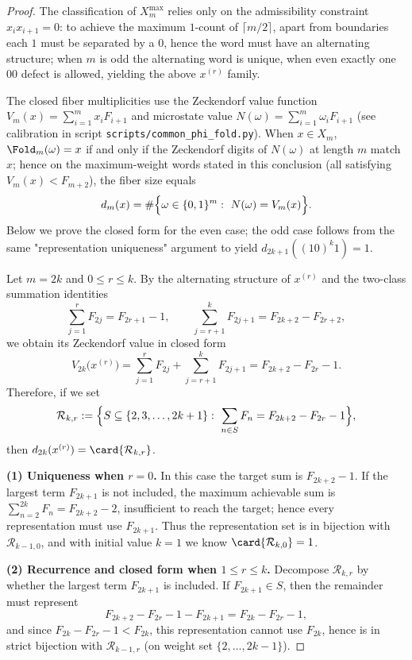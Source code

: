 \begin{proof}
The classification of \(X_m^{\max}\) relies only on the admissibility constraint \(x_ix_{i+1}=0\): to achieve the maximum \(1\)-count of \(\lceil m/2\rceil\), apart from boundaries each \(1\) must be separated by a \(0\), hence the word must have an alternating structure; when \(m\) is odd the alternating word is unique, when even exactly one \(00\) defect is allowed, yielding the above \(x^{(r)}\) family.
\par
The closed fiber multiplicities use the Zeckendorf value function \(V_m(x)=\sum_{i=1}^m x_iF_{i+1}\) and microstate value \(N(\omega)=\sum_{i=1}^m\omega_iF_{i+1}\) (see calibration in script \texttt{scripts/common\_phi\_fold.py}). When \(x\in X_m\),
\(\Fold_m(\omega)=x\) if and only if the Zeckendorf digits of \(N(\omega)\) at length \(m\) match \(x\); hence on the maximum-weight words stated in this conclusion (all satisfying \(V_m(x)<F_{m+2}\)), the fiber size equals
\[
d_m(x)=\#\Bigl\{\omega\in\{0,1\}^m:\ N(\omega)=V_m(x)\Bigr\}.
\]
Below we prove the closed form for the even case; the odd case follows from the same "representation uniqueness" argument to yield \(d_{2k+1}((10)^k1)=1\).
\par
Let \(m=2k\) and \(0\le r\le k\). By the alternating structure of \(x^{(r)}\) and the two-class summation identities
\[
\sum_{j=1}^{r}F_{2j}=F_{2r+1}-1,\qquad
\sum_{j=r+1}^{k}F_{2j+1}=F_{2k+2}-F_{2r+2},
\]
we obtain its Zeckendorf value in closed form
\[
V_{2k}\bigl(x^{(r)}\bigr)=\sum_{j=1}^{r}F_{2j}+\sum_{j=r+1}^{k}F_{2j+1}
=F_{2k+2}-F_{2r}-1.
\]
Therefore, if we set
\[
\mathcal{R}_{k,r}:=\Bigl\{S\subseteq\{2,3,\dots,2k+1\}:\ \sum_{n\in S}F_n=F_{2k+2}-F_{2r}-1\Bigr\},
\]
then \(d_{2k}(x^{(r)})=\card{\mathcal{R}_{k,r}}\).
\par
\noindent\textbf{(1) Uniqueness when \(r=0\).}
In this case the target sum is \(F_{2k+2}-1\). If the largest term \(F_{2k+1}\) is not included, the maximum achievable sum is
\(\sum_{n=2}^{2k}F_n=F_{2k+2}-2\), insufficient to reach the target; hence every representation must use \(F_{2k+1}\).
Thus the representation set is in bijection with \(\mathcal{R}_{k-1,0}\), and with initial value \(k=1\) we know \(\card{\mathcal{R}_{k,0}}=1\).
\par
\noindent\textbf{(2) Recurrence and closed form when \(1\le r\le k\).}
Decompose \(\mathcal{R}_{k,r}\) by whether the largest term \(F_{2k+1}\) is included. If \(F_{2k+1}\in S\), then the remainder must represent
\[
F_{2k+2}-F_{2r}-1-F_{2k+1}=F_{2k}-F_{2r}-1,
\]
and since \(F_{2k}-F_{2r}-1<F_{2k}\), this representation cannot use \(F_{2k}\), hence is in strict bijection with \(\mathcal{R}_{k-1,r}\) (on weight set \(\{2,\dots,2k-1\}\)).

\end{proof}
